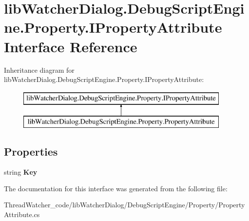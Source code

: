 \hypertarget{interfacelib_watcher_dialog_1_1_debug_script_engine_1_1_property_1_1_i_property_attribute}{\section{lib\+Watcher\+Dialog.\+Debug\+Script\+Engine.\+Property.\+I\+Property\+Attribute Interface Reference}
\label{interfacelib_watcher_dialog_1_1_debug_script_engine_1_1_property_1_1_i_property_attribute}
}
Inheritance diagram for lib\+Watcher\+Dialog.\+Debug\+Script\+Engine.\+Property.\+I\+Property\+Attribute\+:\begin{figure}[H]
\begin{center}
\leavevmode
\includegraphics[height=2.000000cm]{interfacelib_watcher_dialog_1_1_debug_script_engine_1_1_property_1_1_i_property_attribute}
\end{center}
\end{figure}
\subsection*{Properties}
\begin{DoxyCompactItemize}
\item 
\hypertarget{interfacelib_watcher_dialog_1_1_debug_script_engine_1_1_property_1_1_i_property_attribute_ad92a3754ad7b7bd19a5e8a357922d082}{string {\bfseries Key}}\label{interfacelib_watcher_dialog_1_1_debug_script_engine_1_1_property_1_1_i_property_attribute_ad92a3754ad7b7bd19a5e8a357922d082}

\end{DoxyCompactItemize}


The documentation for this interface was generated from the following file\+:\begin{DoxyCompactItemize}
\item 
Thread\+Watcher\+\_\+code/lib\+Watcher\+Dialog/\+Debug\+Script\+Engine/\+Property/Property\+Attribute.\+cs\end{DoxyCompactItemize}
